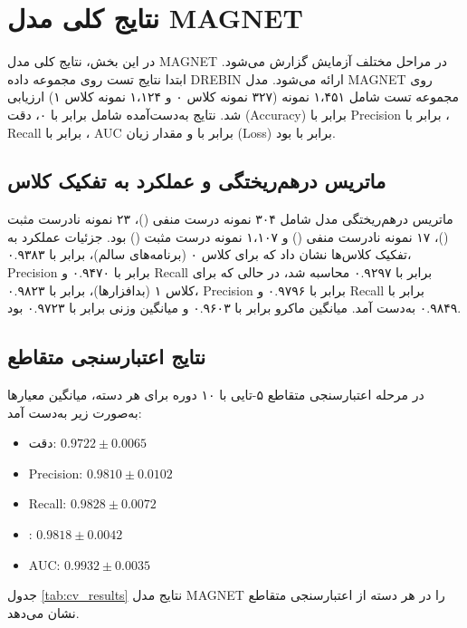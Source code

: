 \section{نتایج کلی مدل MAGNET}
در این بخش، نتایج کلی مدل MAGNET در مراحل مختلف آزمایش گزارش می‌شود. ابتدا نتایج تست روی مجموعه داده DREBIN \cite{Drebin} ارائه می‌شود. مدل MAGNET روی مجموعه تست شامل ۱،۴۵۱ نمونه (۳۲۷ نمونه کلاس ۰ و ۱،۱۲۴ نمونه کلاس ۱) ارزیابی شد. نتایج به‌دست‌آمده شامل  برابر با ۰، دقت (Accuracy) برابر با  Precision برابر با ، Recall برابر با ، AUC برابر با  و مقدار زیان (Loss) برابر با  بود.

\subsection{ماتریس درهم‌ریختگی و عملکرد به تفکیک کلاس}
ماتریس درهم‌ریختگی مدل شامل ۳۰۴ نمونه درست منفی ()، ۲۳ نمونه نادرست مثبت ()، ۱۷ نمونه نادرست منفی () و ۱،۱۰۷ نمونه درست مثبت () بود. جزئیات عملکرد به تفکیک کلاس‌ها نشان داد که برای کلاس ۰ (برنامه‌های سالم)،  برابر با ۰.۹۳۸۳، Precision برابر با ۰.۹۴۷۰ و Recall برابر با ۰.۹۲۹۷ محاسبه شد، در حالی که برای کلاس ۱ (بدافزارها)،  برابر با ۰.۹۸۲۳، Precision برابر با ۰.۹۷۹۶ و Recall برابر با ۰.۹۸۴۹ به‌دست آمد. میانگین ماکرو  برابر با ۰.۹۶۰۳ و میانگین وزنی  برابر با ۰.۹۷۲۳ بود.

\subsection{نتایج اعتبارسنجی متقاطع}
در مرحله اعتبارسنجی متقاطع ۵-تایی با ۱۰ دوره برای هر دسته، میانگین معیارها به‌صورت زیر به‌دست آمد:
\begin{itemize}
    \item دقت: $0.9722 \pm 0.0065$
    \item Precision: $0.9810 \pm 0.0102$
    \item Recall: $0.9828 \pm 0.0072$
    \item {}: $0.9818 \pm 0.0042$
    \item AUC: $0.9932 \pm 0.0035$
\end{itemize}

جدول \ref{tab:cv_results} نتایج مدل MAGNET را در هر دسته از اعتبارسنجی متقاطع نشان می‌دهد.

